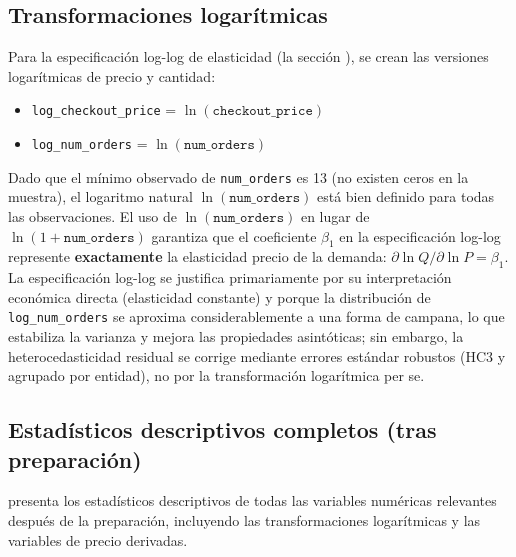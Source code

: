 \documentclass[doc, a4paper, biblatex, floatsintext, longtable, babel]{apa7}
\begin{document}
\subsection{Transformaciones logar\'itmicas}
\label{sec:transformaciones_log}

Para la especificaci\'on log-log de elasticidad (la secci\'on ), se crean las versiones logar\'itmicas de precio y cantidad:

\begin{itemize}
    \item \texttt{log\_checkout\_price} = $\ln(\texttt{checkout\_price})$
    \item \texttt{log\_num\_orders} = $\ln(\texttt{num\_orders})$
\end{itemize}

Dado que el m\'inimo observado de \texttt{num\_orders} es 13 (no existen ceros en la muestra), el logaritmo natural $\ln(\texttt{num\_orders})$ est\'a bien definido para todas las observaciones. El uso de $\ln(\texttt{num\_orders})$ en lugar de $\ln(1+\texttt{num\_orders})$ garantiza que el coeficiente $\beta_1$ en la especificaci\'on log-log represente \textbf{exactamente} la elasticidad precio de la demanda: $\partial\ln Q/\partial\ln P = \beta_1$. La especificaci\'on log-log se justifica primariamente por su interpretaci\'on econ\'omica directa (elasticidad constante) y porque la distribuci\'on de \texttt{log\_num\_orders} se aproxima considerablemente a una forma de campana, lo que estabiliza la varianza y mejora las propiedades asint\'oticas; sin embargo, la heterocedasticidad residual se corrige mediante errores estándar robustos (HC3 y agrupado por entidad), no por la transformaci\'on logar\'itmica per se.

\subsection{Estad\'isticos descriptivos completos (tras preparaci\'on)}

 presenta los estad\'isticos descriptivos de todas las variables num\'ericas relevantes despu\'es de la preparaci\'on, incluyendo las transformaciones logar\'itmicas y las variables de precio derivadas.
\end{document}
